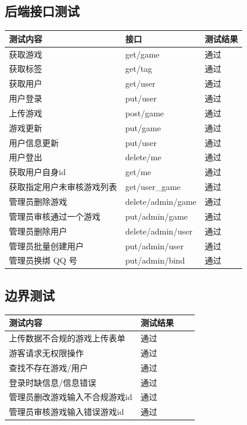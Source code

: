 \documentclass[12pt]{ctexart} %
\begin{document}
\subsection{后端接口测试}
\begin{table}[H]
\centering
\renewcommand{\arraystretch}{1.5} 
\large
\begin{tabular}{|>{\centering\arraybackslash}m{8cm}|>{\centering\arraybackslash}m{5cm}|>{\centering\arraybackslash}m{3cm}|}
\hline
\textbf{测试内容} & \textbf{接口} & \textbf{测试结果}\\
\hline
获取游戏 & get/game & 通过\\
\hline
获取标签 & get/tag & 通过\\
\hline
获取用户 & get/user & 通过\\
\hline
用户登录 & put/user & 通过\\
\hline
上传游戏 & post/game & 通过\\
\hline
游戏更新 & put/game & 通过\\
\hline
用户信息更新 & put/user & 通过\\
\hline
用户登出 & delete/me & 通过\\
\hline
获取用户自身id & get/me & 通过\\
\hline
获取指定用户未审核游戏列表 & get/user\_game & 通过\\
\hline
管理员删除游戏 & delete/admin/game & 通过\\
\hline
管理员审核通过一个游戏 & put/admin/game & 通过\\
\hline
管理员删除用户 & delete/admin/user & 通过\\
\hline
管理员批量创建用户 & put/admin/user & 通过\\
\hline
管理员换绑 QQ 号 & put/admin/bind & 通过\\
\hline
\end{tabular}
\end{table}

\subsection{边界测试}
\begin{table}[H]
\centering
\large
\renewcommand{\arraystretch}{1.5} 
\begin{tabular}{|>{\centering\arraybackslash}p{12cm}|>{\centering\arraybackslash}p{3cm}|>{\centering\arraybackslash}p{5cm}|>{\raggedright\arraybackslash}p{4cm}|}
\hline
\textbf{测试内容} & \textbf{测试结果} \\
\hline
 上传数据不合规的游戏上传表单 & 通过 \\
\hline
 游客请求无权限操作 & 通过 \\
\hline
 查找不存在游戏/用户 & 通过 \\
\hline
 登录时缺信息/信息错误 & 通过 \\
\hline
 管理员删改游戏输入不合规游戏id & 通过 \\
\hline
 管理员审核游戏输入错误游戏id & 通过 \\
\hline
\end{tabular}
\end{table}
\end{document}
